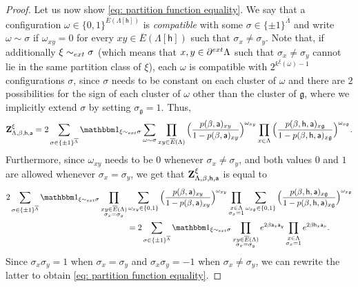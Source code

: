 \documentclass[11pt,a4paper]{article}
\theoremstyle{definition}
\numberwithin{equation}{section}
\newcommand\fg{\mathfrak{g}}
\begin{document}
\begin{proof}
Let us now show \eqref{eq: partition function equality}. We say that a configuration $\omega\in \{0,1\}^{\overline{E}(\Lambda[\mathsf{h}])}$ is \emph{compatible} with some $\sigma\in \{\pm 1\}^{\overline\Lambda}$ and write $\omega\sim \sigma$ if $\omega_{xy}=0$ for every $xy\in \overline{E}(\Lambda[\mathsf{h}])$ such that $\sigma_x\neq \sigma_y$. Note that, if additionally $\xi \sim_{\rm ext} \sigma$ (which means that $x,y\in \partial^{\rm ext}\Lambda$ such that $\sigma_x\neq \sigma_y$ cannot lie in the same partition class of $\xi$), each $\omega$ is compatible with $2^{k^\xi(\omega)-1}$ configurations $\sigma$, since $\sigma$ needs to be constant on each cluster of $\omega$ and there are $2$ possibilities for the sign of each cluster of $\omega$ other than the cluster of $\fg$, where we implicitly extend $\sigma$ by setting $\sigma_{\mathfrak g}=1$. Thus,
\begin{equation}
{\bf Z}^{\xi}_{\Lambda,\beta, \mathsf h, \mathsf{a}}=2\sum_{\sigma\in \{\pm 1\}^{\overline \Lambda}}\mathbbm 1_{\xi\sim_{\rm ext}\sigma}\sum_{\omega\sim \sigma}\prod_{xy \in \overline{E}(\Lambda)} \Big(\frac{p(\beta,\mathsf{a})_{xy}}{1-p(\beta,\mathsf{a})_{xy}}\Big)^{\omega_{xy}} \prod_{x \in \Lambda} \Big(\frac{p(\beta,\mathsf{h},\mathsf{a})_{x\fg}}{1-p(\beta,\mathsf{h},\mathsf{a})_{x\fg}}\Big)^{\omega_{x\fg}}.    
\end{equation}
Furthermore, since $\omega_{xy}$ needs to be $0$ whenever $\sigma_x\neq \sigma_y$, and both values $0$ and $1$ are allowed whenever $\sigma_x=\sigma_y$, we get that ${\bf Z}^{\xi}_{\Lambda,\beta, \mathsf h, \mathsf{a}}$ is equal to
\begin{equation}
\begin{aligned}
2\sum_{\sigma\in \{\pm 1\}^{\overline \Lambda}}\mathbbm 1_{\xi\sim_{\rm ext}\sigma}\prod_{\substack{xy \in \overline{E}(\Lambda)\\ \sigma_x=\sigma_y}}&\sum_{\omega_{xy}\in \{0,1\}} \Big(\frac{p(\beta,\mathsf{a})_{xy}}{1-p(\beta,\mathsf{a})_{xy}}\Big)^{\omega_{xy}} \prod_{\substack{x \in \Lambda \\ \sigma_x=1}}\sum_{\omega_{x\fg}\in \{0,1\}} \Big(\frac{p(\beta,\mathsf{h},\mathsf{a})_{x\fg}}{1-p(\beta,\mathsf{h},\mathsf{a})_{x\fg}}\Big)^{\omega_{x\fg}}\\
&=2\sum_{\sigma\in \{\pm 1\}^{\overline \Lambda}}\mathbbm 1_{\xi\sim_{\rm ext}\sigma}\prod_{\substack{xy \in \overline{E}(\Lambda)\\ \sigma_x=\sigma_y}}e^{2\beta \mathsf{a}_x \mathsf{a}_y} \prod_{\substack{x \in \Lambda \\ \sigma_x=1}} e^{2\beta \mathsf{h}_x \mathsf{a}_{x}}.
\end{aligned}
\end{equation}
Since $\sigma_x\sigma_y=1$ when $\sigma_x=\sigma_y$ and $\sigma_x\sigma_y=-1$ when $\sigma_x\neq \sigma_y$, we can rewrite the latter to obtain \eqref{eq: partition function equality}.


\end{proof}
\end{document}
